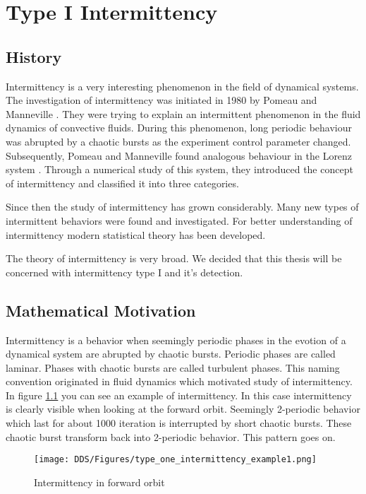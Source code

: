 \chapter{Type I Intermittency}
\label{chap:intermittency_review}

\section{History}
Intermittency is a very interesting phenomenon in the field of dynamical systems.
The investigation of intermittency was initiated in 1980 by Pomeau and Manneville \cite{Pomeau1980}.
They were trying to explain an intermittent phenomenon in the fluid dynamics of convective fluids.
During this phenomenon, long periodic behaviour was abrupted by a chaotic bursts as the experiment control parameter changed.
Subsequently, Pomeau and Manneville found analogous behaviour in the Lorenz system \cite{Lorenz2004}.
Through a numerical study of this system, they introduced the concept of intermittency and classified it into three categories. \cite{Pomeau1980}
\par
Since then the study of intermittency has grown considerably.
Many new types of intermittent behaviors were found and investigated.
For better understanding of intermittency modern statistical theory has been developed.
\cite{Elaskar2017}
\par
The theory of intermittency is very broad.
We decided that this thesis will be concerned with intermittency type I and it's detection.

\section{Mathematical Motivation}
Intermittency is a behavior when seemingly periodic phases in the evotion of a dynamical system are abrupted by chaotic bursts.
Periodic phases are called laminar.
Phases with chaotic bursts are called turbulent phases.
This naming convention originated in fluid dynamics which motivated study of intermittency. \cite{Pomeau1980}
\\
In figure \ref{fig:intermittent_forward_orbit_example} you can see an example of intermittency.
In this case intermittency is clearly visible when looking at the forward orbit.
Seemingly 2-periodic behavior which last for about 1000 iteration is interrupted by short chaotic bursts.
These chaotic burst transform back into 2-periodic behavior.
This pattern goes on.

\begin{figure}[!h]
    \centering
    \texttt{[image: DDS/Figures/type\_one\_intermittency\_example1.png]}
    \caption{Intermittency in forward orbit}
    \label{fig:intermittent_forward_orbit_example}
\end{figure}

